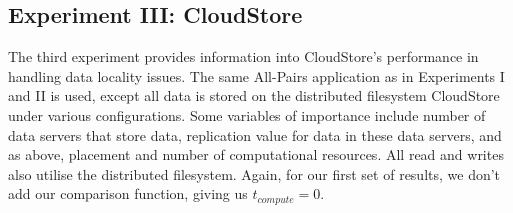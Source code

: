 \documentclass{rspublic}
\begin{document}
\vspace{-0.3cm}

\subsection{Experiment III: CloudStore}\label{Sec:CloudStoreExp}
The third experiment provides information into CloudStore's performance
in handling data locality issues. The same All-Pairs application as in
Experiments I and II is used, except all data is stored on the
distributed filesystem CloudStore under various configurations. Some
variables of importance include number of data servers that store data,
replication value for data in these data servers, and as above,
placement and number of computational resources. All read and writes
also utilise the distributed filesystem. Again, for our first set of
results, we don't add our comparison function, giving us
$t_{compute}=0$.
\end{document}
